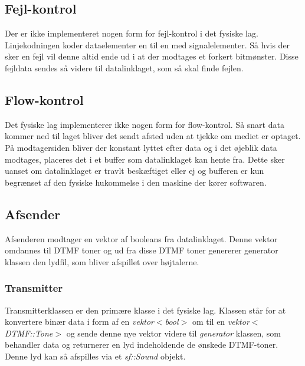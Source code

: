 \subsection{Fejl-kontrol}
Der er ikke implementeret nogen form for fejl-kontrol i det fysiske lag. Linjekodningen koder dataelementer en til en med signalelementer. Så hvis der sker en fejl vil denne altid ende ud i at der modtages et forkert bitmønster. Disse fejldata sendes så videre til datalinklaget, som så skal finde fejlen.

\subsection{Flow-kontrol}
Det fysiske lag implementerer ikke nogen form for flow-kontrol. Så snart data kommer ned til laget bliver det sendt afsted uden at tjekke om mediet er optaget. På modtagersiden bliver der konstant lyttet efter data og i det øjeblik data modtages, placeres det i et buffer som datalinklaget kan hente fra. Dette sker uanset om datalinklaget er travlt beskæftiget eller ej og bufferen er kun begrænset af den fysiske hukommelse i den maskine der kører softwaren.

\subsection{Afsender}
Afsenderen modtager en vektor af booleans fra datalinklaget. Denne vektor omdannes til DTMF toner og ud fra disse DTMF toner genererer generator klassen den lydfil, som bliver afspillet over højtalerne.

\subsubsection{Transmitter}
Transmitterklassen er den primære klasse i det fysiske lag. Klassen står for at konvertere binær data i form af en \textit{vektor$<$bool$>$} om til en \textit{vektor$<$DTMF::Tone$>$} og sende denne nye vektor videre til \textit{generator} klassen, som behandler data og returnerer en lyd indeholdende de ønskede DTMF-toner. Denne lyd kan så afspilles via et  \textit{sf::Sound} objekt.


